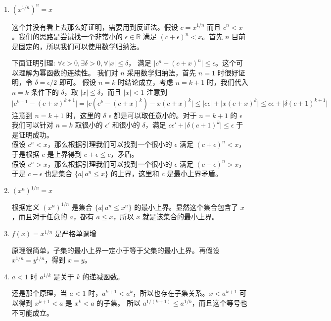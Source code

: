 \begin{enumerate}
    \item $(x^{1/n})^n = x$

这个并没有看上去那么好证明，需要用到反证法。假设 $c = x^{1/n}$ 而且 $ c^n < x$。我们的思路是尝试找一个非常小的 $\epsilon \in \mathbb{R}$ 满足 $(c+\epsilon)^n < x$。首先 $n$ 目前是固定的，所以我们可以使用数学归纳法。

下面证明引理: $\forall \epsilon > 0, \exists \delta > 0 , \forall \lvert x \rvert \le \delta $， 满足 $ \lvert c^n - (c+x)^n \rvert \le \epsilon $。这个可以理解为幂函数的连续性。
我们对 $n $ 采用数学归纳法，首先 $n = 1$ 时很好证明，令 $\delta = \epsilon / 2$ 即可。
假设 $n = k$ 时结论成立，考虑 $n = k + 1$ 时，我们代入 $n = k$ 条件下的 $\delta$，取 $ \lvert x \rvert \le \delta $，而且 $\lvert x \rvert < 1$ 注意到 $\lvert c^{k+1} - (c+x)^{k+1} \rvert = \lvert c(c^k - (c+x)^k) - x(c+x)^{k} \rvert \le  \lvert c \epsilon \rvert  +  \lvert x(c+x)^{k} \rvert \le  c \epsilon + \lvert \delta (c+1)^{k+1} \rvert $
注意到 $n = k + 1$ 时，这里的 $\delta$ $\epsilon $ 都是可以取任意小的。对于 $n = k + 1$ 的 $\epsilon $ 我们可以针对 $n = k$ 取很小的 $\epsilon' $ 和很小的 $\delta $，满足 
$c \epsilon' + \lvert \delta (c+1)^{k} \rvert  \le \epsilon $ 于是证明成功。 \\

假设 $c ^n < x$，那么根据引理我们可以找到一个很小的 $\epsilon$ 满足 $(c+\epsilon)^n < x$，于是根据 $c$ 是上界得到 $c + \epsilon \le c$，矛盾。 \\
假设 $c ^n > x$，那么根据引理我们可以找到一个很小的 $\epsilon$ 满足 $(c-\epsilon)^n > x$，于是 $c - \epsilon$ 也是集合 $\{ a \vert \, a^n \le x \}$ 的上界，这里和 $c$ 是最小上界矛盾。\\

    \item $(x^n)^{1/n} = x$

根据定义 $(x^n)^{1/n}$ 是集合 $\{a \vert \, a^n \le x^n \}$ 的最小上界。显然这个集合包含了 $x$，而且对于任意的 $a$，都有 $a \le x$，所以 $x$ 就是该集合的最小上界。\\

    \item $f(x) = x^{1/n}$ 是严格单调增

原理很简单，子集的最小上界一定小于等于父集的最小上界。再假设 $x^{1/n} = y ^{1/n}$，得到 $x = y$。

    \item $a < 1$ 时 $a^{1/k}$ 是关于 $k$ 的递减函数。

还是那个原理，当 $a < 1 $ 时，$a^{k+1} < a^{k} $，所以也存在子集关系。$x < a^{k+1} $ 可以得到 $ x^{k+1} < a$ 是 $x ^k < a$ 的子集。
所以 $a^{1/(k+1)} \le a^{1/k} $，而且这个等号也不可能成立。 


\end{enumerate}
